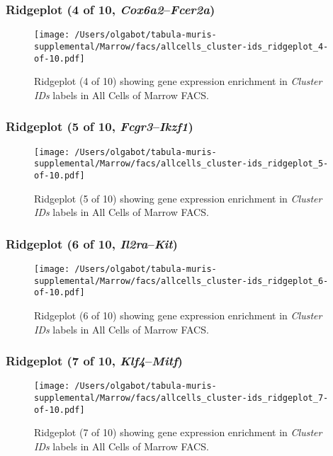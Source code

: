 \clearpage

\subsubsection{Ridgeplot (4 of 10, \emph{Cox6a2}--\emph{Fcer2a})}
\begin{figure}[h]
\centering
\texttt{[image: /Users/olgabot/tabula-muris-supplemental/Marrow/facs/allcells\_cluster-ids\_ridgeplot\_4-of-10.pdf]}

\caption{ Ridgeplot (4 of 10)  showing gene expression enrichment in \emph{Cluster IDs} labels in All Cells of Marrow FACS. }
\end{figure}


\clearpage

\subsubsection{Ridgeplot (5 of 10, \emph{Fcgr3}--\emph{Ikzf1})}
\begin{figure}[h]
\centering
\texttt{[image: /Users/olgabot/tabula-muris-supplemental/Marrow/facs/allcells\_cluster-ids\_ridgeplot\_5-of-10.pdf]}

\caption{ Ridgeplot (5 of 10)  showing gene expression enrichment in \emph{Cluster IDs} labels in All Cells of Marrow FACS. }
\end{figure}


\clearpage

\subsubsection{Ridgeplot (6 of 10, \emph{Il2ra}--\emph{Kit})}
\begin{figure}[h]
\centering
\texttt{[image: /Users/olgabot/tabula-muris-supplemental/Marrow/facs/allcells\_cluster-ids\_ridgeplot\_6-of-10.pdf]}

\caption{ Ridgeplot (6 of 10)  showing gene expression enrichment in \emph{Cluster IDs} labels in All Cells of Marrow FACS. }
\end{figure}


\clearpage

\subsubsection{Ridgeplot (7 of 10, \emph{Klf4}--\emph{Mitf})}
\begin{figure}[h]
\centering
\texttt{[image: /Users/olgabot/tabula-muris-supplemental/Marrow/facs/allcells\_cluster-ids\_ridgeplot\_7-of-10.pdf]}

\caption{ Ridgeplot (7 of 10)  showing gene expression enrichment in \emph{Cluster IDs} labels in All Cells of Marrow FACS. }
\end{figure}


